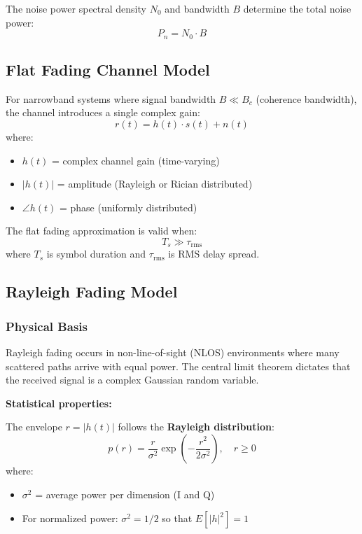 The noise power spectral density $N_0$ and bandwidth $B$ determine the total noise power:
\begin{equation}
P_n = N_0 \cdot B
\end{equation}

\subsection{Flat Fading Channel Model}

For narrowband systems where signal bandwidth $B \ll B_c$ (coherence bandwidth), the channel introduces a single complex gain:
\begin{equation}
r(t) = h(t) \cdot s(t) + n(t)
\end{equation}
where:
\begin{itemize}
\item $h(t)$ = complex channel gain (time-varying)
\item $|h(t)|$ = amplitude (Rayleigh or Rician distributed)
\item $\angle h(t)$ = phase (uniformly distributed)
\end{itemize}

The flat fading approximation is valid when:
\begin{equation}
T_s \gg \tau_{\text{rms}}
\end{equation}
where $T_s$ is symbol duration and $\tau_{\text{rms}}$ is RMS delay spread.

\subsection{Rayleigh Fading Model}

\subsubsection{Physical Basis}

Rayleigh fading occurs in non-line-of-sight (NLOS) environments where many scattered paths arrive with equal power. The central limit theorem dictates that the received signal is a complex Gaussian random variable.

\textbf{Statistical properties:}

The envelope $r = |h(t)|$ follows the \textbf{Rayleigh distribution}:
\begin{equation}
p(r) = \frac{r}{\sigma^2} \exp\left(-\frac{r^2}{2\sigma^2}\right), \quad r \geq 0
\end{equation}
where:
\begin{itemize}
\item $\sigma^2$ = average power per dimension (I and Q)
\item For normalized power: $\sigma^2 = 1/2$ so that $E[|h|^2] = 1$
\end{itemize}

